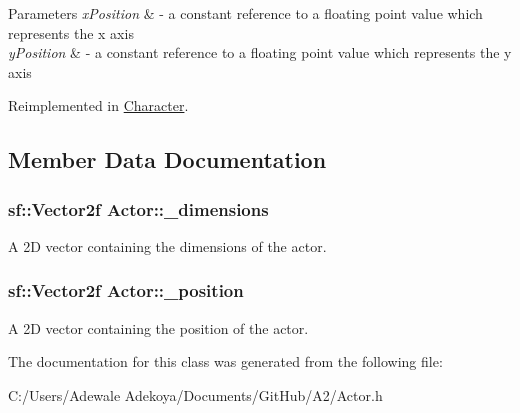 \begin{DoxyParams}{Parameters}
{\em x\+Position} & -\/ a constant reference to a floating point value which represents the x axis \\
\hline
{\em y\+Position} & -\/ a constant reference to a floating point value which represents the y axis \\
\hline
\end{DoxyParams}


Reimplemented in \hyperlink{class_character_a6fd2cc7114d91771abc82f223bde585b}{Character}.



\subsection{Member Data Documentation}
\hypertarget{class_actor_acfabf742ec617868223278c3b8f91336}{}
\subsubsection[{\+\_\+dimensions}]{\setlength{\rightskip}{0pt plus 5cm}sf\+::\+Vector2f Actor\+::\+\_\+dimensions\hspace{0.3cm}{\ttfamily [protected]}}\label{class_actor_acfabf742ec617868223278c3b8f91336}
A 2\+D vector containing the dimensions of the actor. \hypertarget{class_actor_ad3760883a99be5b4aaa2635ca761c29b}{}
\subsubsection[{\+\_\+position}]{\setlength{\rightskip}{0pt plus 5cm}sf\+::\+Vector2f Actor\+::\+\_\+position\hspace{0.3cm}{\ttfamily [protected]}}\label{class_actor_ad3760883a99be5b4aaa2635ca761c29b}
A 2\+D vector containing the position of the actor. 

The documentation for this class was generated from the following file\+:\begin{DoxyCompactItemize}
\item 
C\+:/\+Users/\+Adewale Adekoya/\+Documents/\+Git\+Hub/\+A2/Actor.\+h\end{DoxyCompactItemize}
